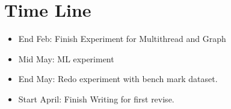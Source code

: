 \section{Time Line}
\label{sec:history}
\begin{itemize}
    \item End Feb: Finish Experiment for Multithread and Graph
    \item Mid May: ML experiment
    \item End May: Redo experiment with bench mark dataset.
    \item Start April: Finish Writing for first revise.
\end{itemize}


